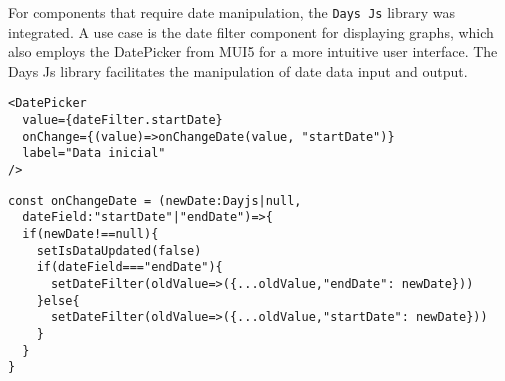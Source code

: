 For components that require date manipulation, the \texttt{Days Js} library \cite{dayJsInstallation} was integrated. A use case is the date filter component for displaying graphs, which also employs the DatePicker \cite{muiDatePickerValidation} from \gls{MUI5} for a more intuitive user interface. The Days Js library facilitates the manipulation of date data input and output.

\begin{verbatim}
<DatePicker
  value={dateFilter.startDate}
  onChange={(value)=>onChangeDate(value, "startDate")}
  label="Data inicial"
/>
\end{verbatim}

\begin{verbatim}
const onChangeDate = (newDate:Dayjs|null, 
  dateField:"startDate"|"endDate")=>{
  if(newDate!==null){
    setIsDataUpdated(false)
    if(dateField==="endDate"){
      setDateFilter(oldValue=>({...oldValue,"endDate": newDate}))
    }else{
      setDateFilter(oldValue=>({...oldValue,"startDate": newDate}))
    }
  }
}
\end{verbatim}